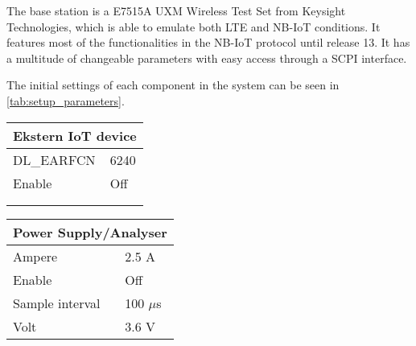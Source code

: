 The base station is a E7515A UXM Wireless Test Set from Keysight Technologies, which is able to emulate both LTE and NB-IoT conditions. It features most of the functionalities in the NB-IoT protocol until release 13. It has a multitude of changeable parameters with easy access through a SCPI interface. \citep{UXM}

The initial settings of each component in the system can be seen in \autoref{tab:setup_parameters}.

\begin{table}[H]
\captionsetup{belowskip=0em}
\noindent
\centering
\begin{minipage}[t]{0.48\textwidth}
\begin{tabular}{|p{4cm}|p{2cm}|} \hline
\multicolumn{2}{|c|}{\textbf{Ekstern IoT device}}   \\ \hline
DL\_EARFCN         & 6240           \\ \hline
Enable             & Off            \\ \hline
\multicolumn{2}{c}{}  \\ 
\multicolumn{2}{c}{}  \\ 
\end{tabular}
\end{minipage}%
\hfill
\begin{minipage}[t]{0.48\textwidth}
\raggedleft
\begin{tabular}{|p{4cm}|p{2cm}|} \hline
\multicolumn{2}{|c|}{\textbf{Power Supply/Analyser}} \\ \hline
Ampere             & 2.5 A          \\ \hline
Enable             & Off            \\ \hline
Sample interval       & 100 $\mu$s        \\ \hline
Volt               & 3.6 V          \\ \hline
\end{tabular}
\vspace{1em}
\end{minipage}
\end{table}

